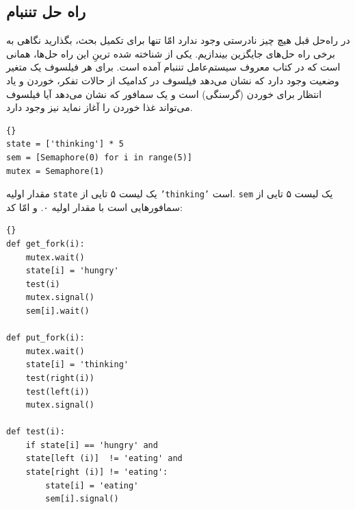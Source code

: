 \documentclass{book}
\begin{document}
\subsection{راه حل تننبام}

    در راه‌حل قبل هیچ چیز نادرستی وجود ندارد امّا تنها برای تکمیل بحث، بگذارید نگاهی به برخی راه حل‌های جایگزین بیندازیم. 
    یکی از شناخته‌ شده ترینِ  این راه حل‌ها، همانی است که در کتاب معروف سیستم‌عامل تننبام آمده است\cite{tanenbaum}. 
    برای هر فیلسوف یک متغیر وضعیت وجود دارد که نشان می‌دهد فیلسوف در کدامیک از حالات تفکر، خوردن و یاد انتظار برای خوردن (گرسنگی) است و 
    یک سمافور که نشان می‌دهد آیا فیلسوف می‌تواند غذا خوردن را آغاز نماید نیز وجود دارد. 

\begin{latin}
\begin{lstlisting}[title=\rl{متغیرهای راه‌حل تننبام}]{}
state = ['thinking'] * 5
sem = [Semaphore(0) for i in range(5)]
mutex = Semaphore(1)
\end{lstlisting}
\end{latin}

    مقدار اولیه {\tt state} یک لیست ۵ تایی از {\tt 'thinking'} است.     {\tt sem}
    یک لیست ۵ تایی از سمافورهایی است با مقدار اولیه ۰. 
    و امّا کد: 

\begin{latin}
\begin{lstlisting}[title=\rl{ راه‌حل تننبام}]{}
def get_fork(i):
    mutex.wait()
    state[i] = 'hungry'
    test(i)
    mutex.signal()
    sem[i].wait()

def put_fork(i):
    mutex.wait()
    state[i] = 'thinking'
    test(right(i))
    test(left(i))
    mutex.signal()

def test(i):
    if state[i] == 'hungry' and
    state[left (i)]  != 'eating' and
    state[right (i)] != 'eating':
        state[i] = 'eating'
        sem[i].signal()
\end{lstlisting}
\end{latin}
\end{document}
